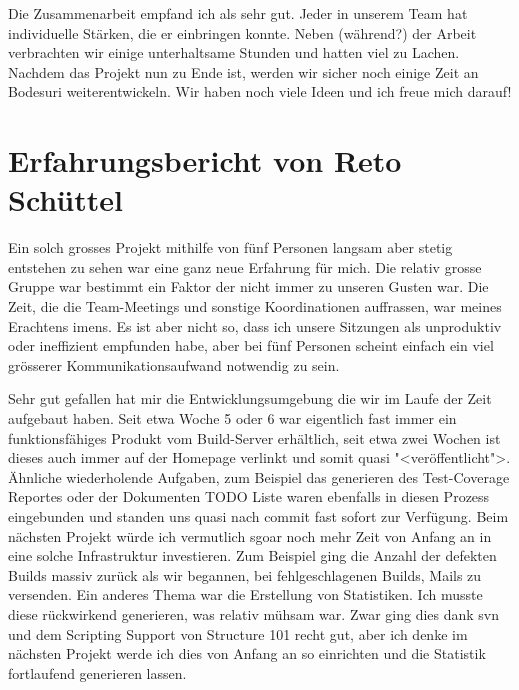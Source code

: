 \documentclass[12pt,halfparskip]{scrartcl}
\begin{document}
Die Zusammenarbeit empfand ich als sehr gut. Jeder in unserem Team hat individuelle Stärken, die er einbringen konnte. Neben (während?) der Arbeit verbrachten wir einige unterhaltsame Stunden und hatten viel zu Lachen. Nachdem das Projekt nun zu Ende ist, werden wir sicher noch einige Zeit an Bodesuri weiterentwickeln. Wir haben noch viele Ideen und ich freue mich darauf!

\section{Erfahrungsbericht von Reto Schüttel}

Ein solch grosses Projekt mithilfe von fünf Personen langsam aber stetig entstehen zu sehen war eine ganz neue Erfahrung für mich. Die relativ grosse Gruppe war bestimmt ein Faktor der nicht immer zu unseren Gusten war. Die Zeit, die die Team-Meetings und sonstige Koordinationen auffrassen, war meines Erachtens imens. Es ist aber nicht so, dass ich unsere Sitzungen als unproduktiv oder ineffizient empfunden habe, aber bei fünf Personen scheint einfach ein viel grösserer Kommunikationsaufwand notwendig zu sein.

Sehr gut gefallen hat mir die Entwicklungsumgebung die wir im Laufe der Zeit aufgebaut haben. Seit etwa Woche 5 oder 6 war eigentlich fast immer ein funktionsfähiges Produkt vom Build-Server erhältlich, seit etwa zwei Wochen ist dieses auch immer auf der Homepage verlinkt und somit quasi "<veröffentlicht">.  Ähnliche wiederholende Aufgaben, zum Beispiel das generieren des Test-Coverage Reportes oder der Dokumenten TODO Liste waren ebenfalls in diesen Prozess eingebunden und standen uns quasi nach commit fast sofort zur Verfügung. Beim nächsten Projekt würde ich vermutlich sgoar noch mehr Zeit von Anfang an in eine solche Infrastruktur investieren. Zum Beispiel ging die Anzahl der defekten Builds massiv zurück als wir begannen, bei fehlgeschlagenen Builds, Mails zu versenden. Ein anderes Thema war die Erstellung von Statistiken. Ich musste diese rückwirkend generieren, was relativ mühsam war. Zwar ging dies dank svn und dem Scripting Support von Structure 101 recht gut, aber ich denke im nächsten Projekt werde ich dies von Anfang an so einrichten und die Statistik fortlaufend generieren lassen.
\end{document}
